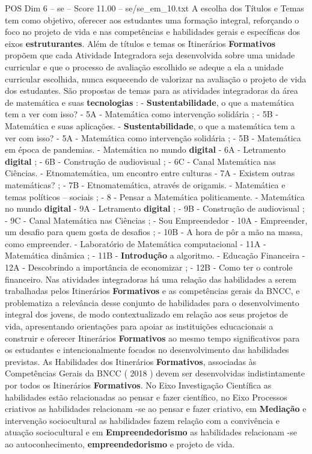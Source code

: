 \begin{textsample}{POS Dim 6 – se – Score 11.00 – se/se\_em\_10.txt}
A escolha dos Títulos e Temas tem como objetivo, oferecer aos estudantes uma formação integral, reforçando o foco no projeto de vida e nas competências e habilidades gerais e específicas dos eixos \textbf{estruturantes}.
Além de títulos e temas os Itinerários \textbf{Formativos} propõem que cada Atividade Integradora seja desenvolvida sobre uma unidade curricular e que o processo de avaliação escolhido se adeque a ela a unidade curricular escolhida, nunca esquecendo de valorizar na avaliação o projeto de vida dos estudantes.
São propostas de temas para as atividades integradoras da área de matemática e suas \textbf{tecnologias} : - \textbf{Sustentabilidade}, o que a matemática tem a ver com isso? - 5A - Matemática como intervenção solidária ; - 5B - Matemática e suas aplicações. - \textbf{Sustentabilidade}, o que a matemática tem a ver com isso? - 5A - Matemática como intervenção solidária ; - 5B - Matemática em época de pandemias. - Matemática no mundo \textbf{digital} - 6A - Letramento \textbf{digital} ; - 6B - Construção de audiovisual ; - 6C - Canal Matemática nas Ciências. - Etnomatemática, um encontro entre culturas - 7A - Existem outras matemáticas? ; - 7B - Etnomatemática, através de origamis. - Matemática e temas políticos – sociais ; - 8 - Pensar a Matemática politicamente. - Matemática no mundo \textbf{digital} - 9A - Letramento \textbf{digital} ; - 9B - Construção de audiovisual ; - 9C - Canal Matemática nas Ciências ; - Sou Empreendedor - 10A - Empreender, um desafio para quem gosta de desafios ; - 10B - A hora de pôr a mão na massa, como empreender. - Laboratório de Matemática computacional - 11A - Matemática dinâmica ; - 11B - \textbf{Introdução} a algoritmo. - Educação Financeira - 12A - Descobrindo a importância de economizar ; - 12B - Como ter o controle financeiro.
Nas atividades integradoras há uma relação das habilidades a serem trabalhadas pelos Itinerários \textbf{Formativos} e as competências gerais da BNCC, e problematiza a relevância desse conjunto de habilidades para o desenvolvimento integral dos jovens, de modo contextualizado em relação aos seus projetos de vida, apresentando orientações para apoiar as instituições educacionais a construir e oferecer Itinerários \textbf{Formativos} ao mesmo tempo significativos para os estudantes e intencionalmente focados no desenvolvimento das habilidades previstas.
As Habilidades dos Itinerários \textbf{Formativos}, associadas às Competências Gerais da BNCC ( 2018 ) devem ser desenvolvidas indistintamente por todos os Itinerários \textbf{Formativos}.
No Eixo Investigação Científica as habilidades estão relacionadas ao pensar e fazer científico, no Eixo Processos criativos as habilidades relacionam -se ao pensar e fazer criativo, em \textbf{Mediação} e intervenção sociocultural as habilidades fazem relação com a convivência e atuação sociocultural e em \textbf{Empreendedorismo} as habilidades relacionam -se ao autoconhecimento, \textbf{empreendedorismo} e projeto de vida.

\end{textsample}
